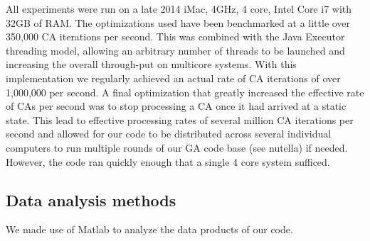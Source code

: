 All experiments were run on a late 2014 iMac, 4GHz, 4 core, Intel Core i7 with 32GB of RAM. The optimizations used have been benchmarked at a little over 350,000 CA iterations per second. This was combined with the Java Executor threading model, allowing an arbitrary number of threads to be launched and increasing the overall through-put on multicore systems. With this implementation we regularly achieved an actual rate of CA iterations of over 1,000,000 per second. A final optimization that greatly increased the effective rate of CAs per second was to stop processing a CA once it had arrived at a static state. This lead to effective processing rates of several million CA iterations per second and allowed for our code to be distributed across several individual computers to run multiple rounds of our GA code base (see nutella) if needed. However, the code ran quickly enough that a single 4 core system sufficed.

\subsection{Data analysis methods}

We made use of Matlab to analyze the data products of our code.  

